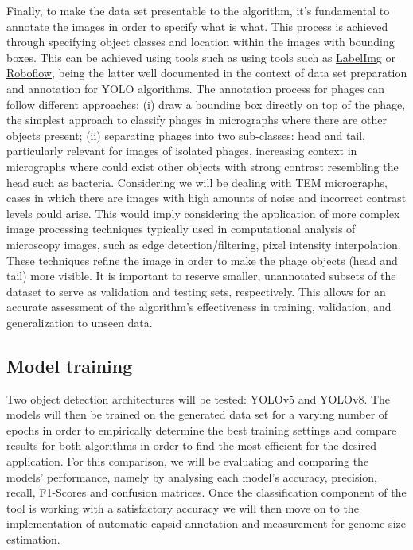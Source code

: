 \documentclass[runningheads]{llncs}
\begin{document}
Finally, to make the data set presentable to the algorithm, it’s fundamental to annotate the images in order to specify what is what. This process is achieved through specifying object classes and location within the images with bounding boxes. This can be achieved using tools such as using tools such as \href{https://pypi.org/project/labelImg/1.4.0/}{LabelImg} or \href{https://docs.ultralytics.com/integrations/roboflow/}{Roboflow}, being the latter well documented in the context of data set preparation and annotation for YOLO algorithms. The annotation process for phages can follow different approaches: (i) draw a bounding box directly on top of the phage, the simplest approach to classify phages in micrographs where there are other objects present; (ii) separating phages into two sub-classes: head and tail, particularly relevant for images of isolated phages, increasing context in micrographs where could exist other objects with strong contrast resembling the head such as bacteria. Considering we will be dealing with TEM micrographs, cases in which there are images with high amounts of noise and incorrect contrast levels could arise. This would imply considering the application of more complex image processing techniques typically used in computational analysis of microscopy images, such as edge detection/filtering, pixel intensity interpolation. These techniques refine the image in order to make the phage objects (head and tail) more visible. \cite{sorzano2009} It is important to reserve smaller, unannotated subsets of the dataset to serve as validation and testing sets, respectively. This allows for an accurate assessment of the algorithm's effectiveness in training, validation, and generalization to unseen data.

\subsection{Model training}

Two object detection architectures will be tested: YOLOv5 and YOLOv8. The models will then be trained on the generated data set for a varying number of epochs in order to empirically determine the best training settings and compare results for both algorithms in order to find the most efficient for the desired application. For this comparison, we will be evaluating and comparing the models' performance, namely by analysing each model's accuracy, precision, recall, F1-Scores and confusion matrices. Once the classification component of the tool is working with a satisfactory accuracy we will then move on to the implementation of automatic capsid annotation and measurement for genome size estimation. 

\newpage
%
%
%
%


%
\end{document}
